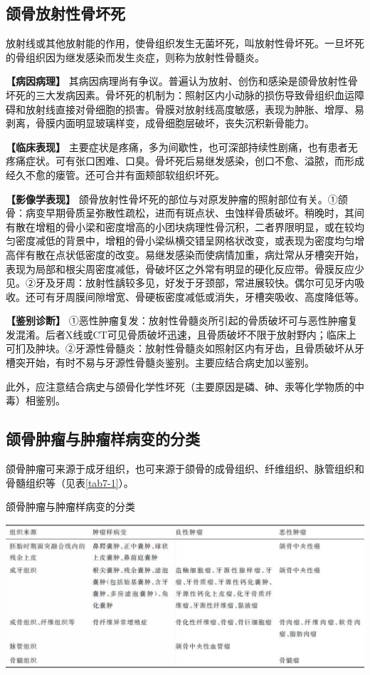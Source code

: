 \subsection{颌骨放射性骨坏死}

放射线或其他放射能的作用，使骨组织发生无菌坏死，叫放射性骨坏死。一旦坏死的骨组织因为继发感染而发生炎症，则称为放射性骨髓炎。

\textbf{【病因病理】}
其病因病理尚有争议。普遍认为放射、创伤和感染是颌骨放射性骨坏死的三大发病因素。骨坏死的机制为：照射区内小动脉的损伤导致骨组织血运障碍和放射线直接对骨细胞的损害。骨膜对放射线高度敏感，表现为肿胀、增厚、易剥离，骨膜内面明显玻璃样变，成骨细胞层破坏，丧失沉积新骨能力。

\textbf{【临床表现】}
主要症状是疼痛，多为间歇性，也可深部持续性剧痛，也有患者无疼痛症状。可有张口困难、口臭。骨坏死后易继发感染，创口不愈、溢脓，而形成经久不愈的瘘管。还可合并有面颊部软组织坏死。

\textbf{【影像学表现】}
颌骨放射性骨坏死的部位与对原发肿瘤的照射部位有关。①颌骨：病变早期骨质呈弥散性疏松，进而有斑点状、虫蚀样骨质破坏。稍晚时，其间有散在增粗的骨小梁和密度增高的小团块病理性骨沉积，二者界限明显，或在较均匀密度减低的背景中，增粗的骨小梁纵横交错呈网格状改变，或表现为密度均匀增高伴有散在点状低密度的改变。易继发感染而使病情加重，病灶常从牙槽突开始，表现为局部和根尖周密度减低，骨破坏区之外常有明显的硬化反应带。骨膜反应少见。②牙及牙周：放射性龋较多见，好发于牙颈部，常进展较快。偶尔可见牙内吸收。还可有牙周膜间隙增宽、骨硬板密度减低或消失，牙槽突吸收、高度降低等。

\textbf{【鉴别诊断】}
①恶性肿瘤复发：放射性骨髓炎所引起的骨质破坏可与恶性肿瘤复发混淆。后者X线或CT可见骨质破坏迅速，且骨质破坏不限于放射野内；临床上可扪及肿块。②牙源性骨髓炎：放射性骨髓炎如照射区内有牙齿，且骨质破坏从牙槽突开始，有时不易与牙源性骨髓炎鉴别。主要应结合病史加以鉴别。

此外，应注意结合病史与颌骨化学性坏死（主要原因是磷、砷、汞等化学物质的中毒）相鉴别。

\subsection{颌骨肿瘤与肿瘤样病变的分类}

颌骨肿瘤可来源于成牙组织，也可来源于颌骨的成骨组织、纤维组织、脉管组织和骨髓组织等（见表\ref{tab7-1}）。

\begin{table}[htbp]
\centering
\caption{颌骨肿瘤与肿瘤样病变的分类}
\label{tab7-1}
\includegraphics[width=\textwidth,height=\textheight,keepaspectratio]{./images/Image00156.jpg}
\end{table}

